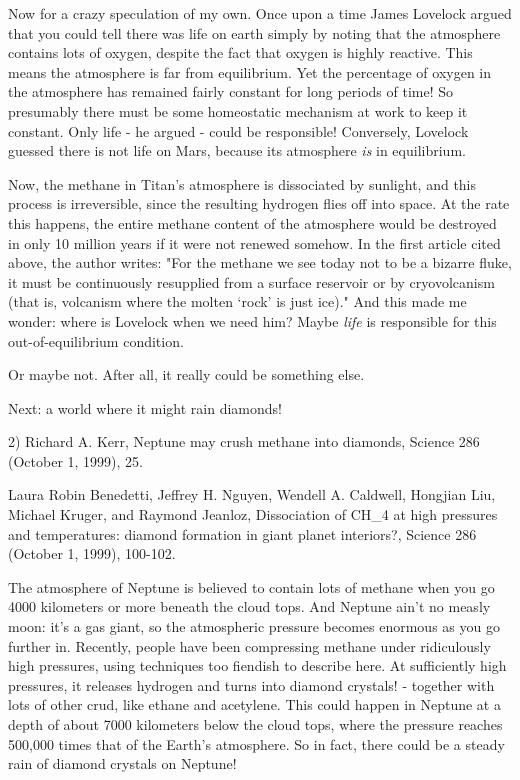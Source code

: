 Now for a crazy speculation of my own.  Once upon a time James Lovelock
argued that you could tell there was life on earth simply by noting that 
the atmosphere contains lots of oxygen, despite the fact that oxygen is
highly reactive.  This means the atmosphere is far from equilibrium.  
Yet the percentage of oxygen in the atmosphere has remained fairly constant
for long periods of time!  So presumably there must be some homeostatic 
mechanism at work to keep it constant.  Only life - he argued - could 
be responsible!  Conversely, Lovelock guessed there is not life on Mars, 
because its atmosphere \emph{is} in equilibrium.   

Now, the methane in Titan's atmosphere is dissociated by sunlight, and
this process is irreversible, since the resulting hydrogen flies off
into space.  At the rate this happens, the entire methane content of the
atmosphere would be destroyed in only 10 million years if it were not
renewed somehow.  In the first article cited above, the author writes:
"For the methane we see today not to be a bizarre fluke, it must be
continuously resupplied from a surface reservoir or by cryovolcanism
(that is, volcanism where the molten `rock' is just ice)." And this
made me wonder: where is Lovelock when we need him?  Maybe \emph{life} is
responsible for this out-of-equilibrium condition.

Or maybe not.  After all, it really could be something else.

Next: a world where it might rain diamonds!

2) Richard A. Kerr, Neptune may crush methane into diamonds, Science
286 (October 1, 1999), 25. 

Laura Robin Benedetti, Jeffrey H. Nguyen, Wendell A. Caldwell, Hongjian 
Liu,  Michael Kruger, and Raymond Jeanloz,  Dissociation of CH_{4} 
at high 
pressures and temperatures: diamond formation in giant planet interiors?,
Science 286 (October 1, 1999), 100-102. 

The atmosphere of Neptune is believed to contain lots of methane when you 
go 4000 kilometers or more beneath the cloud tops.  And Neptune ain't
no measly moon: it's a gas giant, so the atmospheric pressure becomes 
enormous as you go further in.  Recently, people have been compressing
methane under ridiculously high pressures, using techniques too fiendish
to describe here.  At sufficiently high pressures, it releases hydrogen 
and turns into diamond crystals! - together with lots of other crud,
like ethane and acetylene.  This could happen in Neptune at a depth of 
about 7000 kilometers below the cloud tops, where the pressure reaches 
500,000 times that of the Earth's atmosphere.   So in fact, there could 
be a steady rain of diamond crystals on Neptune!

